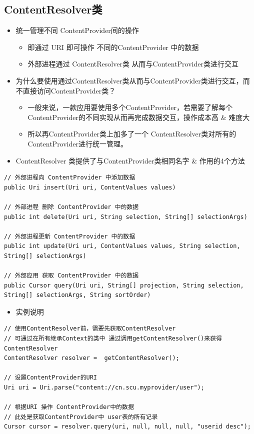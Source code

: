 \documentclass[9pt, b5paper]{article}
\begin{document}
\subsection{ContentResolver类}
\label{sec-1-4}
\begin{itemize}
\item 统一管理不同 ContentProvider间的操作
\begin{itemize}
\item 即通过 URI 即可操作 不同的ContentProvider 中的数据
\item 外部进程通过 ContentResolver类 从而与ContentProvider类进行交互
\end{itemize}
\item 为什么要使用通过ContentResolver类从而与ContentProvider类进行交互，而不直接访问ContentProvider类？
\begin{itemize}
\item 一般来说，一款应用要使用多个ContentProvider，若需要了解每个ContentProvider的不同实现从而再完成数据交互，操作成本高 \& 难度大
\item 所以再ContentProvider类上加多了一个 ContentResolver类对所有的ContentProvider进行统一管理。
\end{itemize}
\item ContentResolver 类提供了与ContentProvider类相同名字 \& 作用的4个方法
\end{itemize}
\begin{verbatim}
// 外部进程向 ContentProvider 中添加数据
public Uri insert(Uri uri, ContentValues values)　 

// 外部进程 删除 ContentProvider 中的数据
public int delete(Uri uri, String selection, String[] selectionArgs)

// 外部进程更新 ContentProvider 中的数据
public int update(Uri uri, ContentValues values, String selection, String[] selectionArgs)　 

// 外部应用 获取 ContentProvider 中的数据
public Cursor query(Uri uri, String[] projection, String selection, String[] selectionArgs, String sortOrder)
\end{verbatim}
\begin{itemize}
\item 实例说明
\end{itemize}
\begin{verbatim}
// 使用ContentResolver前，需要先获取ContentResolver
// 可通过在所有继承Context的类中 通过调用getContentResolver()来获得ContentResolver
ContentResolver resolver =  getContentResolver(); 

// 设置ContentProvider的URI
Uri uri = Uri.parse("content://cn.scu.myprovider/user"); 
 
// 根据URI 操作 ContentProvider中的数据
// 此处是获取ContentProvider中 user表的所有记录 
Cursor cursor = resolver.query(uri, null, null, null, "userid desc");
\end{verbatim}
\end{document}
